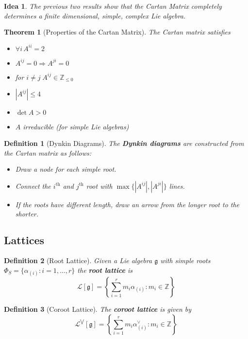 \documentclass{article}
\newtheorem{theorem}{Theorem}[subsection]
\newtheorem{definition}{Definition}[subsection]
\newtheorem*{idea}{Idea}
\newcommand{\bam}[1]{\textbf{#1}}
\newcommand{\mf}[1]{\mathfrak{#1}}
\newcommand{\mbb}[1]{\mathbb{#1}}
\begin{document}
\begin{idea}
The previous two results show that the Cartan Matrix completely determines a finite dimensional, simple, complex Lie algebra. 
\end{idea}

\begin{theorem}[Properties of the Cartan Matrix]
The Cartan matrix satisfies
\begin{itemize}
    \item $\forall i \, A^{ii}=2$
    \item $A^{ij}=0 \Rightarrow A^{ji}=0$
    \item for $i \neq j \; A^{ij}\in\mbb{Z}_{\leq0}$
    \item $|A^{ij}|\leq4$
    \item $\det{A}>0$
    \item $A$ irreducible (for simple Lie algebras)
\end{itemize}
\end{theorem}

\begin{definition}[Dynkin Diagrams]
The \bam{Dynkin diagrams} are constructed from the Cartan matrix as follows:
\begin{itemize}
    \item Draw a node for each simple root.
    \item Connect the $i^{\text{th}}$ and $j^\text{th}$ root with $\max\lbrace |A^{ij}|, |A^{ji}| \rbrace$ lines. 
    \item If the roots have different length, draw an arrow from the longer root to the shorter. 
\end{itemize}
\end{definition}

\subsection{Lattices}

\begin{definition}[Root Lattice]
Given a Lie algebra $\mf{g}$ with simple roots $\Phi_S=\lbrace \alpha_{(i)} : i=1,\dots,r \rbrace$ the \bam{root lattice} is 
\[
\mathcal{L} [\mf{g}] = \left\{ \sum_{i=1}^r m_i \alpha_{(i)} : m_i \in\mbb{Z} \right\}
\]
\end{definition}

\begin{definition}[Coroot Lattice]
The \bam{coroot lattice} is given by 
\[
\mathcal{L}^{\bigvee} [\mf{g}] =\left\{ \sum_{i=1}^r m_i \alpha^\vee_{(i)} : m_i \in\mbb{Z} \right\}
\]
\end{definition}
\end{document}
